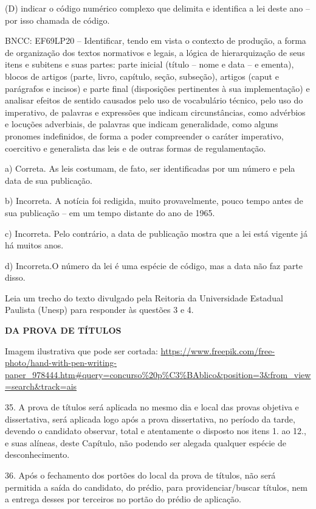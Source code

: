 \begin{itemize}
\begin{itemize}
\begin{escolha}
\begin{escolha}
\begin{escolha}
\begin{escolha}
\begin{escolha}
(D) indicar o código numérico complexo que delimita e identifica a lei
deste ano -- por isso chamada de código.

BNCC: EF69LP20 -- Identificar, tendo em vista o contexto de produção, a
forma de organização dos textos normativos e legais, a lógica de
hierarquização de seus itens e subitens e suas partes: parte inicial
(título -- nome e data -- e ementa), blocos de artigos (parte, livro,
capítulo, seção, subseção), artigos (caput e parágrafos e incisos) e
parte final (disposições pertinentes à sua implementação) e analisar
efeitos de sentido causados pelo uso de vocabulário técnico, pelo uso do
imperativo, de palavras e expressões que indicam circunstâncias, como
advérbios e locuções adverbiais, de palavras que indicam generalidade,
como alguns pronomes indefinidos, de forma a poder compreender o caráter
imperativo, coercitivo e generalista das leis e de outras formas de
regulamentação.

a) Correta. As leis costumam, de fato, ser identificadas por um número e
pela data de sua publicação.

b) Incorreta. A notícia foi redigida, muito provavelmente, pouco tempo
antes de sua publicação -- em um tempo distante do ano de 1965.

c) Incorreta. Pelo contrário, a data de publicação mostra que a lei está
vigente já há muitos anos.

d) Incorreta.O número da lei é uma espécie de código, mas a data não faz
parte disso.

Leia um trecho do texto divulgado pela Reitoria da Universidade Estadual
Paulista (Unesp) para responder às questões 3 e 4.

\textbf{DA PROVA DE TÍTULOS}

Imagem ilustrativa que pode ser cortada:
\url{https://www.freepik.com/free-photo/hand-with-pen-writing-paper_978444.htm\#query=concurso\%20p\%C3\%BAblico\&position=3\&from_view=search\&track=ais}

35. A prova de títulos será aplicada no mesmo dia e local das provas
objetiva e dissertativa, será aplicada logo após a prova dissertativa,
no período da tarde, devendo o candidato observar, total e atentamente o
disposto nos itens 1. ao 12., e suas alíneas, deste Capítulo, não
podendo ser alegada qualquer espécie de desconhecimento.

36. Após o fechamento dos portões do local da prova de títulos, não será
permitida a saída do candidato, do prédio, para providenciar/buscar
títulos, nem a entrega desses por terceiros no portão do prédio de
aplicação.


\end{escolha}
\end{escolha}
\end{escolha}
\end{escolha}
\end{escolha}
\end{itemize}
\end{itemize}
